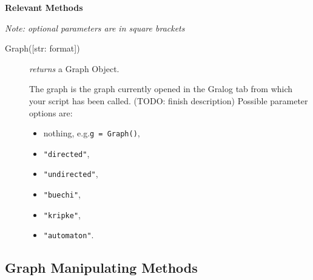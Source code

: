\documentclass{article}
\newlength\q
\begin{document}
\textbf{{\large Relevant Methods}}

\textit{Note: optional parameters are in square brackets}


\begin{description}
\item[Graph({[str: format]})] \emph{returns} a Graph Object.


                                               The graph is the graph
currently opened in the Gralog tab from which your script has been
called. (TODO: finish description) Possible parameter options are:
\begin{itemize}
\item nothing, e.g.\@ \texttt{g = Graph()},
\item \texttt{"directed"},
\item \texttt{"{}undirected"},
\item \texttt{"buechi"},
\item \texttt{"kripke"},
\item \texttt{"{}automaton"}.
\end{itemize}
\end{description}

\subsection{Graph Manipulating Methods}
\end{document}
